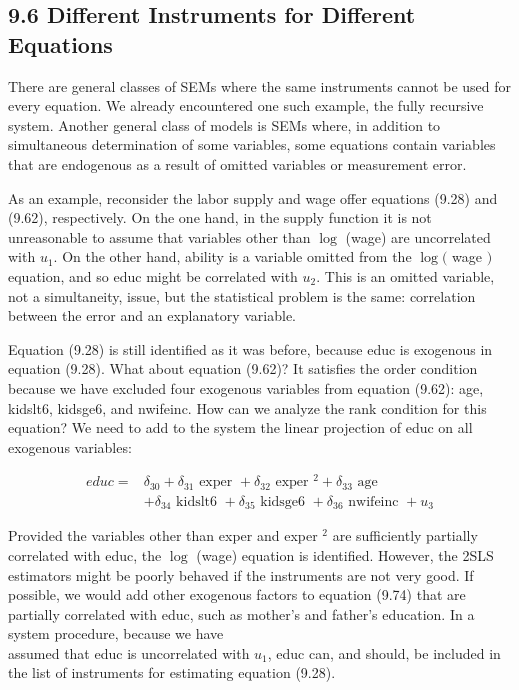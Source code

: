 \documentclass[10pt]{article}
\begin{document}
\subsection*{9.6 Different Instruments for Different Equations}
There are general classes of SEMs where the same instruments cannot be used for every equation. We already encountered one such example, the fully recursive system. Another general class of models is SEMs where, in addition to simultaneous determination of some variables, some equations contain variables that are endogenous as a result of omitted variables or measurement error.

As an example, reconsider the labor supply and wage offer equations (9.28) and (9.62), respectively. On the one hand, in the supply function it is not unreasonable to assume that variables other than $\log$ (wage) are uncorrelated with $u_{1}$. On the other hand, ability is a variable omitted from the $\log ($ wage $)$ equation, and so educ might be correlated with $u_{2}$. This is an omitted variable, not a simultaneity, issue, but the statistical problem is the same: correlation between the error and an explanatory variable.

Equation (9.28) is still identified as it was before, because educ is exogenous in equation (9.28). What about equation (9.62)? It satisfies the order condition because we have excluded four exogenous variables from equation (9.62): age, kidslt6, kidsge6, and nwifeinc. How can we analyze the rank condition for this equation? We need to add to the system the linear projection of educ on all exogenous variables:


\begin{align*}
e d u c= & \delta_{30}+\delta_{31} \text { exper }+\delta_{32} \text { exper }^{2}+\delta_{33} \text { age } \\
& +\delta_{34} \text { kidslt6 }+\delta_{35} \text { kidsge6 }+\delta_{36} \text { nwifeinc }+u_{3} \tag{9.74}
\end{align*}


Provided the variables other than exper and exper ${ }^{2}$ are sufficiently partially correlated with educ, the $\log$ (wage) equation is identified. However, the 2SLS estimators might be poorly behaved if the instruments are not very good. If possible, we would add other exogenous factors to equation (9.74) that are partially correlated with educ, such as mother's and father's education. In a system procedure, because we have\\
assumed that educ is uncorrelated with $u_{1}$, educ can, and should, be included in the list of instruments for estimating equation (9.28).
\end{document}

